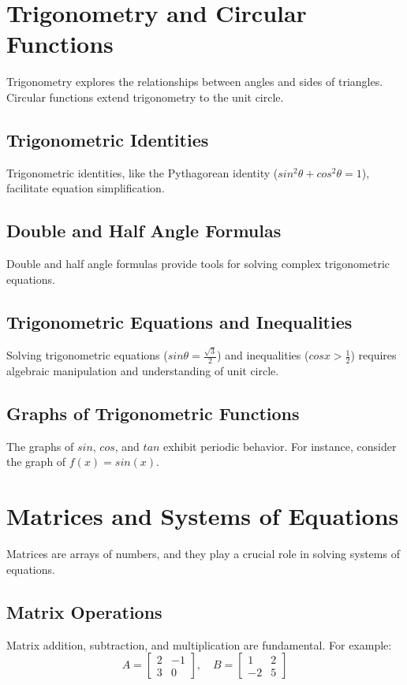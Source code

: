 \documentclass{article}
\begin{document}
\section{Trigonometry and Circular Functions}
Trigonometry explores the relationships between angles and sides of triangles. Circular functions extend trigonometry to the unit circle.

\subsection{Trigonometric Identities}
Trigonometric identities, like the Pythagorean identity (\(sin^2 \theta + cos^2 \theta = 1\)), facilitate equation simplification.

\subsection{Double and Half Angle Formulas}
Double and half angle formulas provide tools for solving complex trigonometric equations.

\subsection{Trigonometric Equations and Inequalities}
Solving trigonometric equations (\(sin \theta = \frac{\sqrt{3}}{2}\)) and inequalities (\(cos x > \frac{1}{2}\)) requires algebraic manipulation and understanding of unit circle.

\subsection{Graphs of Trigonometric Functions}
The graphs of \(sin\), \(cos\), and \(tan\) exhibit periodic behavior. For instance, consider the graph of \(f(x) = sin(x)\).

\section{Matrices and Systems of Equations}
Matrices are arrays of numbers, and they play a crucial role in solving systems of equations.

\subsection{Matrix Operations}
Matrix addition, subtraction, and multiplication are fundamental. For example:
\[ A = \begin{bmatrix} 2 & -1 \\ 3 & 0 \end{bmatrix}, \quad B = \begin{bmatrix} 1 & 2 \\ -2 & 5 \end{bmatrix} \]
\end{document}
